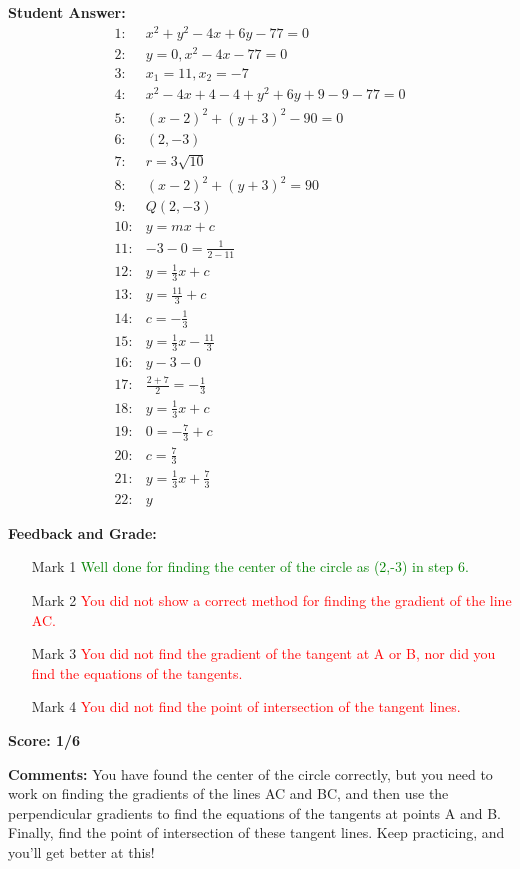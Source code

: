 \documentclass{article}
\begin{document}
\textbf{Student Answer:}
\begin{align*}
1: & x^2+y^2-4x+6y-77=0 \\
2: & y=0,x^2-4x-77=0 \\
3: & x_1=11, x_2=-7 \\
4: & x^2-4x+4-4+y^2+6y+9-9-77=0 \\
5: & (x-2)^2+(y+3)^2-90=0 \\
6: & (2,-3) \\
7: & r=3\sqrt{10} \\
8: & (x-2)^2+(y+3)^2=90 \\
9: & Q(2,-3) \\
10: & y=mx+c \\
11: & -3-0=\frac{1}{2-11} \\
12: & y=\frac{1}{3}x+c \\
13: & y=\frac{11}{3}+c \\
14: & c=-\frac{1}{3} \\
15: & y=\frac{1}{3}x-\frac{11}{3} \\
16: & y-3-0 \\
17: & \frac{2+7}{2}=-\frac{1}{3} \\
18: & y=\frac{1}{3}x+c \\
19: & 0=-\frac{7}{3}+c \\
20: & c=\frac{7}{3} \\
21: & y=\frac{1}{3}x+\frac{7}{3} \\
22: & y
\end{align*}

\textbf{Feedback and Grade:}
\begin{itemize}
\item[Mark 1] \textcolor{green}{Well done for finding the center of the circle as (2,-3) in step 6.}
\item[Mark 2] \textcolor{red}{You did not show a correct method for finding the gradient of the line AC.}
\item[Mark 3] \textcolor{red}{You did not find the gradient of the tangent at A or B, nor did you find the equations of the tangents.}
\item[Mark 4] \textcolor{red}{You did not find the point of intersection of the tangent lines.}
\end{itemize}

\textbf{Score: 1/6}

\textbf{Comments:} You have found the center of the circle correctly, but you need to work on finding the gradients of the lines AC and BC, and then use the perpendicular gradients to find the equations of the tangents at points A and B. Finally, find the point of intersection of these tangent lines. Keep practicing, and you'll get better at this! 
\end{document}
